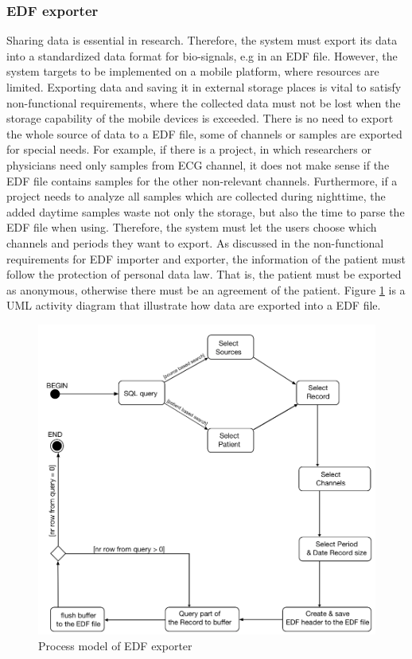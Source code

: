 \subsubsection{EDF exporter}
Sharing data is essential in research. Therefore, the system must export its data into a standardized data format for bio-signals, e.g in an EDF file. However, the system targets to be implemented on a mobile platform, where resources are limited. Exporting data and saving it in external storage places is vital to satisfy non-functional requirements, where the collected data must not be lost when the storage capability of the mobile devices is exceeded. There is no need to export the whole source of data to a EDF file, some of channels or samples are exported for special needs. For example, if there is a project, in which researchers or physicians need only samples from ECG channel, it does not make sense if the EDF file contains samples for the other non-relevant channels. Furthermore, if a project needs to analyze all samples which are collected during nighttime, the added daytime samples waste not only the storage, but also the time to parse the EDF file when using. Therefore, the system must let the users choose which channels and periods they want to export. As discussed in the non-functional requirements for EDF importer and exporter, the information of the patient must follow the protection of personal data law. That is, the patient must be exported as anonymous, otherwise there must be an agreement of the patient. Figure \ref{fig:Figures/EDFExporter} is a UML activity diagram that illustrate how data are exported into a EDF file.
\begin{figure}
    \centering
    \includegraphics[width=1.0\textwidth]{Figures/EDFExporter.png}
    \caption{Process model of EDF exporter}
    \label{fig:Figures/EDFExporter}
\end{figure}
